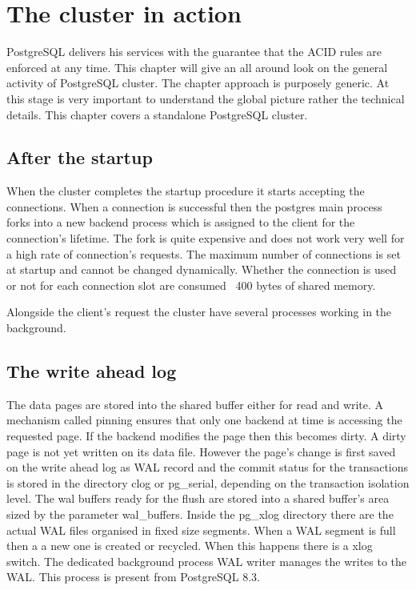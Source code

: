 \chapter{The cluster in action}
PostgreSQL delivers his services with the guarantee that the ACID rules are enforced at any time. 
This chapter will give an all around look on the general activity of PostgreSQL cluster. 
The chapter approach is purposely generic. 
At this stage is very important to understand the global picture rather the technical details. 
This chapter covers a standalone PostgreSQL cluster.

\section{After the startup}
When the cluster completes the startup procedure it starts accepting the connections. When a connection  
is successful then the postgres main process forks into a new backend process which is assigned to the 
client for the connection's lifetime. The fork is quite expensive and does not work very well for a 
high rate of connection's requests. The maximum number of connections is set at startup and cannot be 
changed dynamically. Whether the connection is used or not for each connection slot are consumed ~400 bytes 
of shared memory.\newline

Alongside the client's request the cluster have several processes working in the background. 

\section{The write ahead log} 
The data pages are stored into the shared buffer either for read and write. A mechanism called pinning 
ensures that only one backend at time is accessing the requested page. If the backend modifies the page then 
this becomes dirty. A dirty page is not yet written on its data file. However the page's 
change is first saved on the write ahead log as WAL record and the commit status for the transactions is 
stored in the directory clog or pg\_serial, depending on the transaction isolation level. The wal buffers 
ready for the flush are stored into a shared buffer's area sized by the parameter wal\_buffers.  
Inside the pg\_xlog directory there are the actual WAL files organised in fixed size segments. When a 
WAL segment is full then a a new one is created or recycled. When this happens there is a xlog switch. The 
dedicated background process WAL writer manages the writes to the WAL. This process 
is present from PostgreSQL 8.3.

